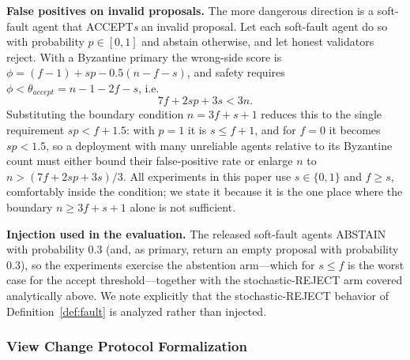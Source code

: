 \documentclass{article}
\begin{document}
\textbf{False positives on invalid proposals.} The more dangerous direction is a soft-fault agent that ACCEPT\emph{s} an invalid proposal. Let each soft-fault agent do so with probability $p \in [0,1]$ and abstain otherwise, and let honest validators reject. With a Byzantine primary the wrong-side score is $\phi = (f{-}1) + sp - 0.5(n{-}f{-}s)$, and safety requires $\phi < \theta_{accept} = n - 1 - 2f - s$, i.e.
\begin{equation}
    7f + 2sp + 3s < 3n .
\end{equation}
Substituting the boundary condition $n = 3f + s + 1$ reduces this to the single requirement $sp < f + 1.5$: with $p = 1$ it is $s \leq f + 1$, and for $f = 0$ it becomes $sp < 1.5$, so a deployment with many unreliable agents relative to its Byzantine count must either bound their false-positive rate or enlarge $n$ to $n > (7f + 2sp + 3s)/3$. All experiments in this paper use $s \in \{0,1\}$ and $f \geq s$, comfortably inside the condition; we state it because it is the one place where the boundary $n \geq 3f + s + 1$ alone is not sufficient.

\textbf{Injection used in the evaluation.} The released soft-fault agents ABSTAIN with probability $0.3$ (and, as primary, return an empty proposal with probability $0.3$), so the experiments exercise the abstention arm---which for $s \leq f$ is the worst case for the accept threshold---together with the stochastic-REJECT arm covered analytically above. We note explicitly that the stochastic-REJECT behavior of Definition~\ref{def:fault} is analyzed rather than injected.

\subsubsection{View Change Protocol Formalization}\label{app:viewchange}
\end{document}
